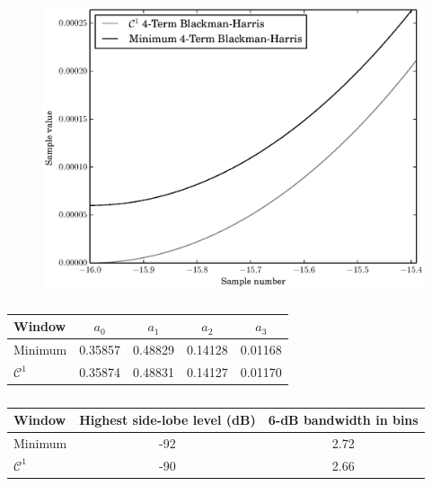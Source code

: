 \begin{figure}[!t]
    \caption{\label{plot:c1vsminblackmancloseup}}
    \centering
    \includegraphics[width=\figwidthscale\textwidth]{plots/c1_vs_min_blackman_closeup.eps}
    \CaptionWithTitle{%
    }{}
\end{figure}

\begin{table}
    \caption{\label{tab:optblackman}}
    \begin{center}
        \begin{tabular}{l c c c c }
            Window & $a_0$ & $a_1$ & $a_2$ & $a_3$ \\
            \hline
            Minimum & 0.35857 & 0.48829 & 0.14128 &
            0.01168 \\
            $\mathcal{C}^{1}$ & 0.35874 & 0.48831 &
            0.14127 & 0.01170
        \end{tabular}
    \end{center}
\end{table}

\begin{table}
    \caption{\label{tab:optvs4termblackman}}
    \begin{center}
        \begin{tabular}{l c c}
            Window & Highest side-lobe level (dB) & 6-dB bandwidth in bins \\
            \hline
            Minimum & -92 & 2.72 \\
            $\mathcal{C}^{1}$ & -90 & 2.66 \\
        \end{tabular}
    \end{center}
\end{table}

